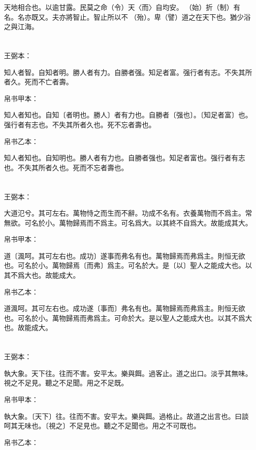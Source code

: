 \documentclass[a5paper]{ctexbook}
\begin{document}
    天地相合也。以逾甘露。民莫之命（令）天〈而〉自均安。󶴪（始）折（制）有名。名亦既又。夫亦將智止。智止所以不󶴪（殆）。卑（譬）道之在天下也。猶少浴之與江海。

    \chapter{}
    王弼本：

    知人者智。自知者明。勝人者有力。自勝者强。知足者富。强行者有志。不失其所者久。死而不亡者壽。

    
    帛书甲本：

    知人者知也。自知〔者明也。勝人〕者有力也。自勝者〔强也〕。〔知足者富〕也。强行者有志也。不失其所者久也。死不忘者壽也。

    帛书乙本：

    知人者知也。自知明也。勝人者有力也。自勝者强也。知足者富也。强行者有志也。不失其所者久也。死而不忘者壽也。

    \chapter{}
    王弼本：

    大道氾兮。其可左右。萬物恃之而生而不辭。功成不名有。衣養萬物而不爲主。常無欲。可名於小。萬物歸焉而不爲主。可名爲大。以其終不自爲大。故能成其大。

    
    帛书甲本：

    道〔渢呵。其可左右也。成功〕遂事而弗名有也。萬物歸焉而弗爲主。則恒无欲也。可名於小。萬物歸焉〔而弗〕爲主。可名於大。是〔以〕聖人之能成大也。以其不爲大也。故能成大。

    帛书乙本：

    道渢呵。其可左右也。成功遂〔事而〕弗名有也。萬物歸焉而弗爲主。則恒无欲也。可名於小。萬物歸焉而弗爲主。可命於大。是以聖人之能成大也。以其不爲大也。故能成大。

    \chapter{}
    王弼本：

    執大象。天下往。往而不害。安平太。樂與餌。過客止。道之出口。淡乎其無味。視之不足見。聽之不足聞。用之不足既。

    
    帛书甲本：

    執大象。〔天下〕往。往而不害。安平太。樂與餌。過格止。故道之出言也。曰談呵其无味也。〔視之〕不足見也。聽之不足聞也。用之不可既也。

    帛书乙本：
\end{document}
